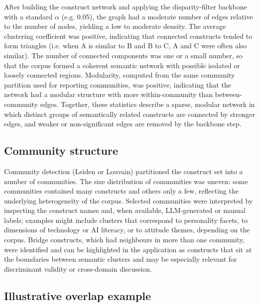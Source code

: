 \documentclass[11pt]{article}
\begin{document}
After building the construct network and applying the disparity-filter backbone with a standard $\alpha$ (e.g. 0.05), the graph had a moderate number of edges relative to the number of nodes, yielding a low to moderate density. The average clustering coefficient was positive, indicating that connected constructs tended to form triangles (i.e. when A is similar to B and B to C, A and C were often also similar). The number of connected components was one or a small number, so that the corpus formed a coherent semantic network with possible isolated or loosely connected regions. Modularity, computed from the same community partition used for reporting communities, was positive, indicating that the network had a modular structure with more within-community than between-community edges. Together, these statistics describe a sparse, modular network in which distinct groups of semantically related constructs are connected by stronger edges, and weaker or non-significant edges are removed by the backbone step.

\subsection{Community structure}

Community detection (Leiden or Louvain) partitioned the construct set into a number of communities. The size distribution of communities was uneven: some communities contained many constructs and others only a few, reflecting the underlying heterogeneity of the corpus. Selected communities were interpreted by inspecting the construct names and, when available, LLM-generated or manual labels; examples might include clusters that correspond to personality facets, to dimensions of technology or AI literacy, or to attitude themes, depending on the corpus. Bridge constructs, which had neighbours in more than one community, were identified and can be highlighted in the application as constructs that sit at the boundaries between semantic clusters and may be especially relevant for discriminant validity or cross-domain discussion.

\subsection{Illustrative overlap example}
\end{document}
